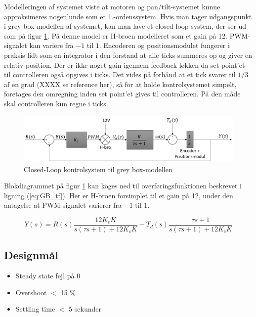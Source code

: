 Modelleringen af systemet viste at motoren og pan/tilt-systemet kunne approksimeres nogenlunde som et 1.-ordenssystem.
Hvis man tager udgangspunkt i grey box-modellen af systemet, kan man lave et closed-loop-system, der ser ud som på figur \ref{fig:GB_Model}. På denne model er H-broen modelleret som et gain på 12. PWM-signalet kan variere fra $-1$ til $1$. Encoderen og positionsmodulet fungerer i praksis lidt som en integrator i den forstand at alle ticks summeres op og giver en relativ position. Der er ikke noget gain igennem feedback-løkken da set point'et til controlleren også opgives i ticks. Det vides på forhånd at et tick svarer til $1/3$ af en grad (XXXX se reference her), så for at holde kontrolsystemet simpelt, foretages den omregning inden set point'et gives til controlleren. På den måde skal controlleren kun regne i ticks.

\begin{figure}[ht]
	\begin{center}
		\includegraphics[scale=0.5]{Billeder/Control_Loop.PNG}
	\end{center}
\caption{Closed-Loop kontrolsystem til grey box-modellen}
\label{fig:GB_Model}
\end{figure}

Blokdiagrammet på figur \ref{fig:GB_Model} kan koges ned til overføringsfunktionen beskrevet i ligning (\ref{eq:GB_tf}). Her er H-broen forsimplet til et gain på 12, under den antagelse at PWM-signalet varierer fra $-1$ til $1$.

\begin{equation}\label{eq:GB_tf}
Y(s)=R(s)\frac{12K_{c}K}{s(\tau s+1)+12K_{c}K}-T_{d}(s)\frac{\tau s+1}{s(\tau s+1)+12K_{c}K}
\end{equation}

\subsection{Designmål}

\begin{itemize}

\item Steady state fejl på 0
\item Overshoot $<$ 15 $\%$
\item Settling time $<$ 5 sekunder

\end{itemize}

